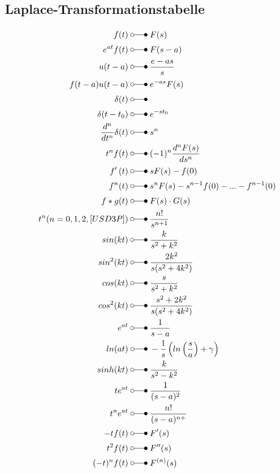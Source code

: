 \subsection{Laplace-Transformationstabelle}
\begin{align*}
    f(t)\;&\laplace\; F(s) \\
    e^{at}f(t)\;&\laplace\; F(s-a) \\
    u(t-a)\;&\laplace\; \frac{e-as}s \\
    f(t-a)u(t-a)\;&\laplace\; e^{-as}F(s) \\
    \delta(t)\;&\laplace\; \\
    \delta(t-t_{0})\;&\laplace\; e^{-st_{0}} \\
    \frac{d^{n}}{dt^{n}}\delta(t)\;&\laplace\; s^{n}  \\
    t^{n}f(t)\;&\laplace\; (-1)^n\frac{d^nF(s)}{ds^n}  \\
    f^{\prime}\left(t\right)\;&\laplace\; \begin{aligned}sF(s)-f(0)\end{aligned}  \\
    f^{n}(t)\;&\laplace\; s^nF(s)-s^{n-1}f(0)-...-f^{n-1}(0)  \\
    f*g(t)\;&\laplace\; \begin{aligned}F(s)\cdot G(s)\end{aligned}  \\
    t^{n}(n=0,1,2,[USD3P])\;&\laplace\; \frac{n!}{s^{n+1}}  \\
    sin(kt)\;&\laplace\; \frac k{s^2+k^2}  \\
    sin^{2}(kt)\;&\laplace\; \frac{2k^2}{s(s^2+4k^2)}  \\
    cos(kt)\;&\laplace\; \frac s{s^2+k^2}  \\
    cos^{2}(kt)\;&\laplace\; \frac{s^2+2k^2}{s(s^2+4k^2)}  \\
    e^{at}\;&\laplace\; \frac1{s-a}  \\
    ln(at)\;&\laplace\; -\frac1s\left(ln\left(\frac sa\right)+\gamma\right)  \\
    sinh(kt)\;&\laplace\; \frac k{s^2-k^2} \\
    te^{at}\;&\laplace\; \frac1{(s-a)^2}  \\
    t^{n}e^{at}\;&\laplace\; \frac{n!}{(s-a)^{n+}}  \\
    -tf(t)\;&\laplace\; F^{\prime}(s)  \\
    t^{2}f(t)\;&\laplace\; F^{\prime\prime}(s)  \\
    \begin{aligned}(-t)^nf(t)\end{aligned}\;&\laplace\; F^{(n)}(s)  \\

\end{align*}

